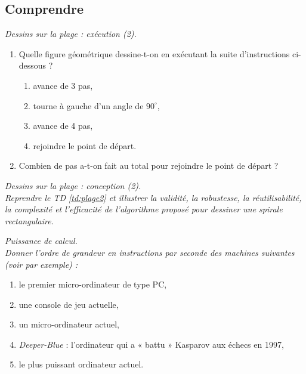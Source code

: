 \subsection{Comprendre}
\begin{td}\label{td:plage3}\em Dessins sur la plage : exécution (2).
\begin{enumerate}
\item Quelle figure géométrique dessine-t-on en exécutant la suite d'instructions 
ci-dessous ?
	\begin{enumerate}
	\item avance de 3 pas,
	\item tourne à gauche d'un angle de $90^\circ$,
	\item avance de 4 pas,
	\item rejoindre le point de départ.
	\end{enumerate}
\item Combien de pas a-t-on fait au total pour rejoindre le point de départ ?
\end{enumerate}
\end{td}

\begin{td}\label{td:plage4}\em Dessins sur la plage : conception (2).\\
Reprendre le TD \ref{td:plage2} et illustrer la validité, la robustesse, 
la réutilisabilité, la complexité et l'efficacité de
l'algorithme proposé pour dessiner une spirale rectangulaire.
\end{td}

\begin{td}\label{td:mips}\em Puissance de calcul.\\
Donner l'ordre de grandeur en instructions par seconde des machines suivantes 
(voir \cite{delahaye} par exemple) :
\begin{enumerate}
\item le premier micro-ordinateur de type PC,
\item une console de jeu actuelle,
\item un micro-ordinateur actuel,
\item {\em Deeper-Blue} : l'ordinateur qui a « battu » Kasparov aux échecs en 1997,
\item le plus puissant ordinateur actuel.
\end{enumerate}
\end{td}

